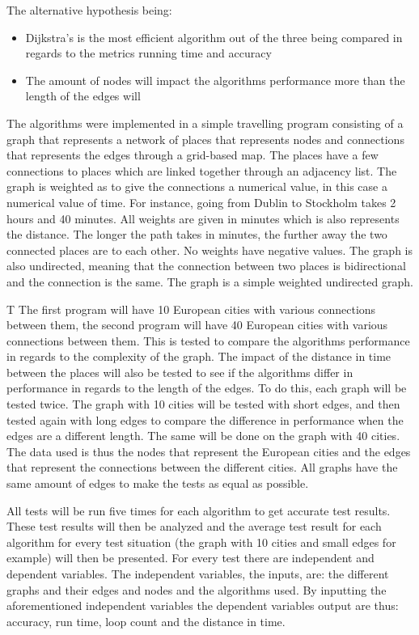 \documentclass{csfourzero}
\begin{document}
The alternative hypothesis being: 
\begin{itemize}
    \item Dijkstra's is the most efficient algorithm out of the three being compared in regards to the metrics running time and accuracy
    \item The amount of nodes will impact the algorithms performance more than the length of the edges will
\end{itemize}

The algorithms were implemented in a simple travelling program consisting of a graph that represents a network of places that represents nodes and connections that represents the edges through a grid-based map. The places have a few connections to places which are linked together through an adjacency list. The graph is weighted as to give the connections a numerical value, in this case a numerical value of time. For instance, going from Dublin to Stockholm takes 2 hours and 40 minutes. All weights are given in minutes which is also represents the distance. The longer the path takes in minutes, the further away the two connected places are to each other. No weights have negative values. The graph is also undirected, meaning that the connection between two places is bidirectional and the connection is the same. The graph is a simple weighted undirected graph. 


T The first program will have 10 European cities with various connections between them, the second program will have 40 European cities with various connections between them. This is tested to compare the algorithms performance in regards to the complexity of the graph. The impact of the distance in time between the places will also be tested to see if the algorithms differ in performance in regards to the length of the edges. To do this, each graph will be tested twice. The graph with 10 cities will be tested with short edges, and then tested again with long edges to compare the difference in performance when the edges are a different length. The same will be done on the graph with 40 cities. The data used is thus the nodes that represent the European cities and the edges that represent the connections between the different cities. All graphs have the same amount of edges to make the tests as equal as possible. 


All tests will be run five times for each algorithm to get accurate test results. These test results will then be analyzed and the average test result for each algorithm for every test situation (the graph with 10 cities and small edges for example) will then be presented. For every test there are independent and dependent variables. The independent variables, the inputs, are: the different graphs and their edges and nodes and the algorithms used. By inputting the aforementioned independent variables the dependent variables output are thus: accuracy, run time, loop count and the distance in time. 
\end{document}
